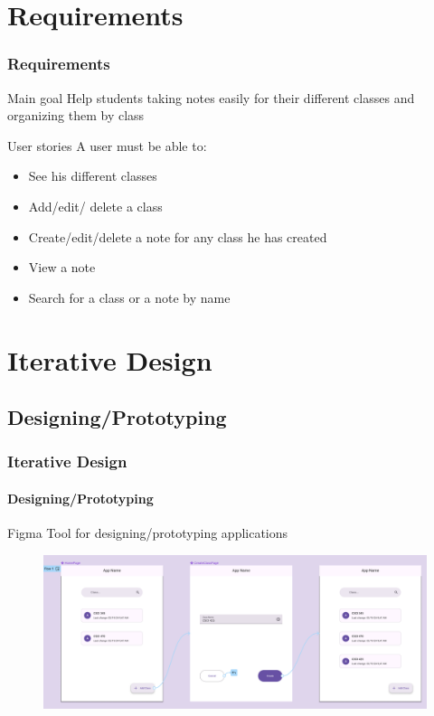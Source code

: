 \documentclass{beamer}
\begin{document}
	\section{Requirements}
	\begin{frame}
		\frametitle{Requirements}
		
		\begin{alertblock}{Main goal}
			Help students taking notes easily for their different classes and organizing them by class
		\end{alertblock}
		
		\begin{alertblock}{User stories}
			A user must be able to:
			\begin{itemize}
				\item See his different classes
				\item Add/edit/ delete a class
				\item Create/edit/delete a note for any class he has created
				\item View a note
				\item  Search for a class or a note by name
			\end{itemize}
		\end{alertblock}
	\end{frame}
	
	\section{Iterative Design}
	\subsection{Designing/Prototyping}
	\begin{frame}
		\frametitle{Iterative Design}
		\framesubtitle{Designing/Prototyping}
		
		\begin{alertblock}{Figma}
			Tool for designing/prototyping applications
		\end{alertblock}
		
		\begin{figure}
			\centering
			\begin{minipage}{1\textwidth}
				\includegraphics[width=\linewidth]{figma_user_story_create_class}
			\end{minipage}
		\end{figure}
	\end{frame}
	
\end{document}
